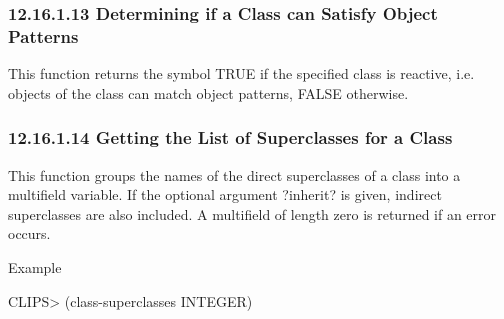 \documentclass[letterpaper,10pt,english]{sphinxmanual}
\begin{document}

\begin{sphinxVerbatim}[commandchars=\\\{\}]
 
\end{sphinxVerbatim}


\subsubsection{12.16.1.13 Determining if a Class can Satisfy Object Patterns}
\label{\detokenize{actions:determining-if-a-class-can-satisfy-object-patterns}}
This function returns the symbol TRUE if the specified class is
reactive, i.e. objects of the class can match object patterns, FALSE
otherwise.


\begin{sphinxVerbatim}[commandchars=\\\{\}]
 
\end{sphinxVerbatim}


\subsubsection{12.16.1.14 Getting the List of Superclasses for a Class}
\label{\detokenize{actions:getting-the-list-of-superclasses-for-a-class}}
This function groups the names of the direct superclasses of a class
into a multifield variable. If the optional argument ?inherit? is given,
indirect superclasses are also included. A multifield of length zero is
returned if an error occurs.


\begin{sphinxVerbatim}[commandchars=\\\{\}]
  \PYG{p}{[}\PYG{p}{]}
\end{sphinxVerbatim}

Example

CLIPS\textgreater{} (class-superclasses INTEGER)
\end{document}
